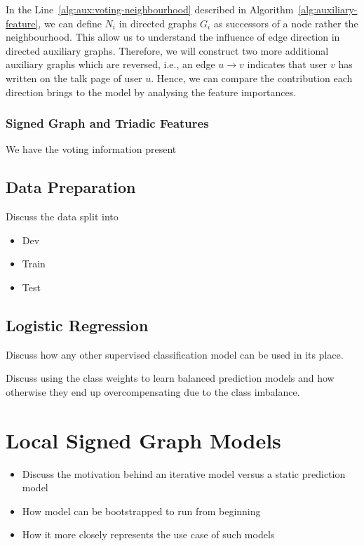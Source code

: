 In the Line~\ref{alg:aux:voting-neighbourhood} described in Algorithm~\ref{alg:auxiliary-feature}, we can define $N_i$ in directed graphs $G_i$ as successors of a node rather the neighbourhood.
This allow us to understand the influence of edge direction in directed auxiliary graphs.
Therefore, we will construct two more additional auxiliary graphs which are reversed, i.e., an edge $u \rightarrow v$ indicates that user $v$ has written on the talk page of user $u$.
Hence, we can compare the contribution each direction brings to the model by analysing the feature importances.

\subsubsection{Signed Graph and Triadic Features}
We have the voting information present 
\subsection{Data Preparation}
    Discuss the data split into
    \begin{itemize}
        \item Dev
        \item Train
        \item Test
    \end{itemize}
\subsection{Logistic Regression}
    Discuss how any other supervised classification model can be used in its place.

    Discuss using the class weights to learn balanced prediction models and how otherwise they end up overcompensating due to the class imbalance.


\section{Local Signed Graph Models}
\label{sec:local-signed-network-implementation}
    \begin{itemize}
        \item Discuss the motivation behind an iterative model versus a static prediction model
        \item How model can be bootstrapped to run from beginning
        \item How it more closely represents the use case of such models
    \end{itemize}
